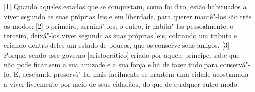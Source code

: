
{[}1{]} Quando aqueles estados que se conquistam, como foi dito, estão
habituados a viver segundo as suas próprias leis e em liberdade, para
querer mantê"-los são três os modos: {[}2{]} o primeiro, arruiná"-los; o
outro, ir habitá"-los pessoalmente; o terceiro, deixá"-los viver segundo
as suas próprias leis, cobrando um tributo e criando dentro deles um
estado de poucos, que os conserve seus amigos. {[}3{]} Porque,
sendo esse governo {[}aristocrático{]} criado por aquele príncipe, sabe
que não pode ficar sem a sua amizade e a sua força e há de fazer tudo
para conservá"-lo. E, desejando preservá"-la, mais facilmente se mantém
uma cidade acostumada a viver livremente por meio de seus
cidadãos, do que de qualquer outro modo.

